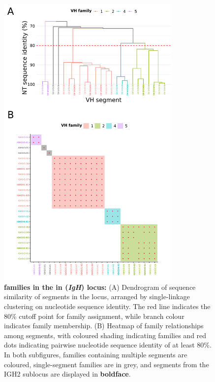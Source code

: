 	\begin{figure}
	\centering
	\begin{subfigure}{0em}
    \label{fig:nfu-vh-families-a}
    \end{subfigure}
    \begin{subfigure}{0em}
    \label{fig:nfu-vh-families-b}
    \end{subfigure}
	\includegraphics[width=0.8\textwidth]{_Figures/png/nfu-vh-families.png}
	\caption[\vh families in the in \Nfu \textit{IgH} locus]{\textbf{\vh families in the in \Nfu (\textit{IgH}) locus:} (A) Dendrogram of sequence similarity of \vh segments in the \Nfu locus, arranged by single-linkage clustering on nucleotide sequence identity. The red line indicates the 80\% cutoff point for family assignment, while branch colour indicates family membership. (B) Heatmap of family relationships among \Nfu \vh segments, with coloured shading indicating families and red dots indicating pairwise nucleotide sequence identity of at least 80\%. In both subfigures, \vh families containing multiple segments are coloured, single-segment families are in grey, and segments from the IGH2 sublocus are displayed in \textbf{boldface}.}
	\label{fig:nfu-vh-families}
	\end{figure}

